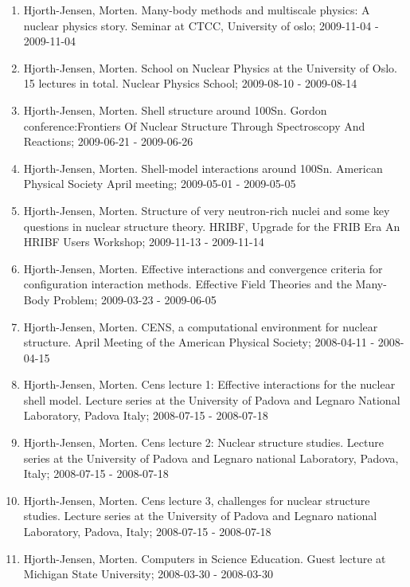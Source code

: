 \documentclass[a4wide,10pt]{article}
\begin{document}
\begin{enumerate}
\item Hjorth-Jensen, Morten.  Many-body methods and multiscale physics: A nuclear physics story. Seminar at CTCC, University of oslo; 2009-11-04 - 2009-11-04

\item Hjorth-Jensen, Morten. School on Nuclear Physics at the University of Oslo. 15 lectures in total. Nuclear Physics School; 2009-08-10 - 2009-08-14

\item Hjorth-Jensen, Morten.  Shell structure around 100Sn. Gordon conference:Frontiers Of Nuclear Structure Through Spectroscopy And Reactions; 2009-06-21 - 2009-06-26

\item Hjorth-Jensen, Morten.  Shell-model interactions around 100Sn. American Physical Society April meeting; 2009-05-01 - 2009-05-05

\item Hjorth-Jensen, Morten.  Structure of very neutron-rich nuclei and some key questions in nuclear structure theory. HRIBF, Upgrade for the FRIB Era An HRIBF Users Workshop; 2009-11-13 - 2009-11-14

\item Hjorth-Jensen, Morten. Effective interactions and convergence criteria for configuration interaction methods. Effective Field Theories and the Many-Body Problem; 2009-03-23 - 2009-06-05

\item Hjorth-Jensen, Morten.  CENS, a computational environment for nuclear structure. April Meeting of the American Physical Society; 2008-04-11 - 2008-04-15

\item Hjorth-Jensen, Morten.  Cens lecture 1: Effective interactions for the nuclear shell model. Lecture series at the University of Padova and Legnaro National Laboratory, Padova Italy; 2008-07-15 - 2008-07-18

\item Hjorth-Jensen, Morten.  Cens lecture 2: Nuclear structure studies. Lecture series at the University of Padova and Legnaro national Laboratory, Padova, Italy; 2008-07-15 - 2008-07-18

\item Hjorth-Jensen, Morten.  Cens lecture 3, challenges for nuclear structure studies. Lecture series at the University of Padova and Legnaro national Laboratory, Padova, Italy; 2008-07-15 - 2008-07-18

\item Hjorth-Jensen, Morten.  Computers in Science Education. Guest lecture at Michigan State University; 2008-03-30 - 2008-03-30


\end{enumerate}
\end{document}
